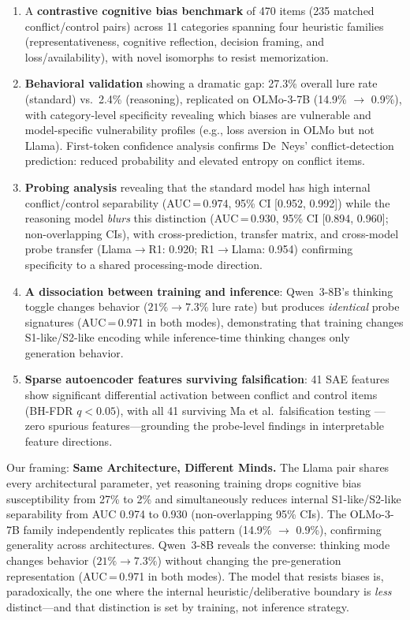 \documentclass[accepted]{article}
\newcommand{\sone}{S1-like}
\newcommand{\stwo}{S2-like}
\begin{document}
\begin{enumerate}[leftmargin=*,itemsep=2pt]
  \item A \textbf{contrastive cognitive bias benchmark} of 470 items
  (235 matched conflict/control pairs) across 11 categories spanning
  four heuristic families (representativeness, cognitive reflection,
  decision framing, and loss/availability), with novel isomorphs to resist
  memorization.

  \item \textbf{Behavioral validation} showing a dramatic gap: 27.3\%
  overall lure rate (standard) vs.\ 2.4\% (reasoning), replicated on
  OLMo-3-7B (14.9\% $\to$ 0.9\%), with category-level specificity
  revealing which biases are vulnerable and model-specific vulnerability
  profiles (e.g., loss aversion in OLMo but not Llama).  First-token
  confidence analysis confirms De~Neys' conflict-detection prediction:
  reduced probability and elevated entropy on conflict items.

  \item \textbf{Probing analysis} revealing that the standard model has
  high internal conflict/control separability (AUC\,=\,0.974, 95\% CI
  [0.952, 0.992]) while the reasoning model \emph{blurs} this distinction
  (AUC\,=\,0.930, 95\% CI [0.894, 0.960]; non-overlapping CIs), with
  cross-prediction, transfer matrix, and cross-model probe transfer
  (Llama$\to$R1: 0.920; R1$\to$Llama: 0.954) confirming specificity
  to a shared processing-mode direction.

  \item \textbf{A dissociation between training and inference}: Qwen~3-8B's
  thinking toggle changes behavior ($21\% \to 7.3\%$ lure rate) but produces
  \emph{identical} probe signatures (AUC\,=\,0.971 in both modes),
  demonstrating that training changes \sone{}/\stwo{} encoding while
  inference-time thinking changes only generation behavior.

  \item \textbf{Sparse autoencoder features surviving falsification}: 41
  SAE features show significant differential activation between conflict
  and control items (BH-FDR $q < 0.05$), with all 41 surviving Ma et
  al.\ falsification testing \citep{ma2026falsification}---zero spurious
  features---grounding the probe-level findings in interpretable feature
  directions.
\end{enumerate}

\noindent Our framing: \textbf{Same Architecture, Different Minds.}
The Llama pair shares every architectural parameter, yet reasoning
training drops cognitive bias susceptibility from 27\% to 2\% and
simultaneously reduces internal \sone{}/\stwo{} separability from
AUC 0.974 to 0.930 (non-overlapping 95\% CIs).  The OLMo-3-7B family
independently replicates this pattern (14.9\% $\to$ 0.9\%), confirming
generality across architectures.  Qwen~3-8B reveals the converse: thinking mode
changes behavior ($21\% \to 7.3\%$) without changing the pre-generation
representation (AUC\,=\,0.971 in both modes).  The model that resists
biases is, paradoxically, the one where the internal
heuristic/deliberative boundary is \emph{less} distinct---and that
distinction is set by training, not inference strategy.
\end{document}
